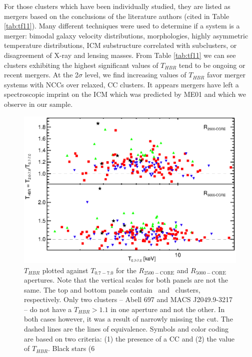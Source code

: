For those clusters which have been individually studied, they are
listed as mergers based on the conclusions of the literature authors
(cited in Table \ref{tab:tf11}). Many different techniques were used
to determine if a system is a merger: bimodal galaxy velocity
distributions, morphologies, highly asymmetric temperature
distributions, ICM substructure correlated with subclusters, or
disagreement of X-ray and lensing masses. From Table \ref{tab:tf11} we
can see clusters exhibiting the highest significant values of
$T_{HBR}$ tend to be ongoing or recent mergers. At the 2$\sigma$
level, we find increasing values of $T_{HBR}$ favor merger systems
with NCCs over relaxed, CC clusters. It appears mergers have left a
spectroscopic imprint on the ICM which was predicted by ME01 and which
we observe in our sample.

\begin{figure}
\begin{center}
\includegraphics*[width=\textwidth, trim=15mm 10mm 0mm 0mm, clip]{eband_f8.eps}
\caption[Plot of $T_{HBR}$ vs. broadband temperatures color-coded for
  different cluster types]{$T_{HBR}$ plotted against $T_{0.7-7.0}$ for
  the $R_{2500-\mathrm{CORE}}$ and $R_{5000-\mathrm{CORE}}$
  apertures. Note that the vertical scales for both panels are not the
  same. The top and bottom panels contain \ebandnuma\ and \ebandnumb\
  clusters, respectively. Only two clusters -- Abell 697 and MACS
  J2049.9-3217 -- do not have a $T_{HBR} > 1.1$ in one aperture and
  not the other. In both cases however, it was a result of narrowly
  missing the cut. The dashed lines are the lines of
  equivalence. Symbols and color coding are based on two criteria: (1)
  the presence of a CC and (2) the value of $T_{HBR}$. Black stars (6
}
\end{center}
\end{figure}
